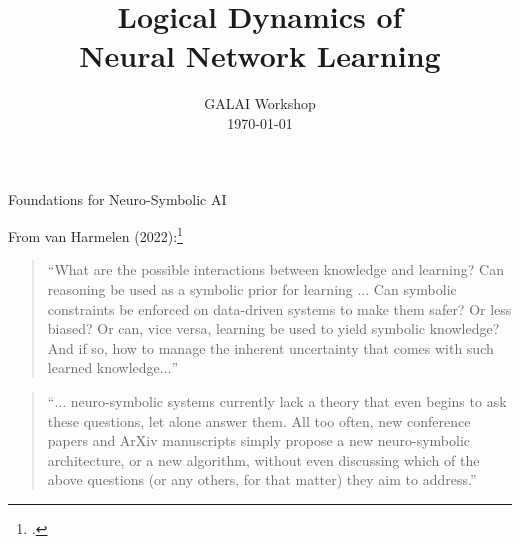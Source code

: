 \documentclass[12pt,t]{beamer}
\title{\Large{\textbf{Logical Dynamics of\\ Neural Network Learning}}}
\author{ \large{\hilight{\textbf{Caleb Schultz Kisby}}}
}
\institute{\normalsize{Collab.\ with Sa\'ul Blanco \& Larry Moss\\ Indiana University}}
\date{\nth{1} GALAI Workshop\\ \today}
\theoremstyle{definition}
\begin{document}

{

\frame{
    \titlepage
}}

\begin{frame}{Foundations for Neuro-Symbolic AI}

From van Harmelen (2022):\footcite{vanHarmelen}\\
\vspace{1ex}

\begin{quote}
    \footnotesize \textup{``What are the possible interactions between knowledge and learning? Can reasoning be used as a symbolic prior for learning $\ldots$ Can symbolic constraints be enforced on data-driven systems to make them safer? Or less biased? Or can, vice versa, learning be used to yield symbolic knowledge? And if so, how to manage the inherent uncertainty that comes with such learned knowledge$\ldots$''}
\end{quote}

\vspace{1ex}

\begin{quote}
    \footnotesize \textup{``$\ldots$ neuro-symbolic systems currently lack a theory that even begins to ask these questions, let alone answer them. All too often, new conference papers and ArXiv manuscripts simply propose a new neuro-symbolic architecture, or a new algorithm, without even discussing which of the above questions (or any others, for that matter) they aim to address.''}
\end{quote}


\end{frame}
\end{document}
